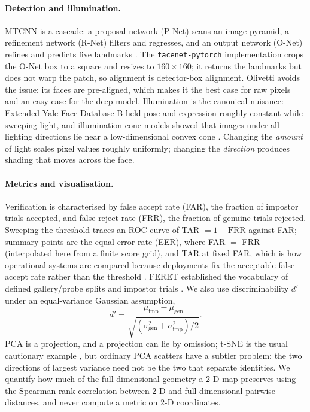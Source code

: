 \paragraph{Detection and illumination.} MTCNN is a cascade: a proposal network (P-Net) scans an image pyramid, a refinement network (R-Net) filters and regresses, and an output network (O-Net) refines and predicts five landmarks \citep{zhang2016}. The \texttt{facenet-pytorch} implementation crops the O-Net box to a square and resizes to $160\times160$; it returns the landmarks but does not warp the patch, so alignment is detector-box alignment. Olivetti avoids the issue: its faces are pre-aligned, which makes it the best case for raw pixels and an easy case for the deep model. Illumination is the canonical nuisance: Extended Yale Face Database B held pose and expression roughly constant while sweeping light, and illumination-cone models showed that images under all lighting directions lie near a low-dimensional convex cone \citep{georghiades2001}. Changing the \emph{amount} of light scales pixel values roughly uniformly; changing the \emph{direction} produces shading that moves across the face.

\paragraph{Metrics and visualisation.} Verification is characterised by false accept rate (FAR), the fraction of impostor trials accepted, and false reject rate (FRR), the fraction of genuine trials rejected. Sweeping the threshold traces an ROC curve of TAR $=1-\mathrm{FRR}$ against FAR; summary points are the equal error rate (EER), where FAR $=$ FRR (interpolated here from a finite score grid), and TAR at fixed FAR, which is how operational systems are compared because deployments fix the acceptable false-accept rate rather than the threshold \citep{grother2019}. FERET established the vocabulary of defined gallery/probe splits and impostor trials \citep{phillips2000}. We also use discriminability $d'$ under an equal-variance Gaussian assumption,
\begin{equation}
d'=\frac{\mu_{\mathrm{imp}}-\mu_{\mathrm{gen}}}{\sqrt{(\sigma_{\mathrm{gen}}^2+\sigma_{\mathrm{imp}}^2)/2}}.
\label{eq:dprime}
\end{equation}
PCA is a projection, and a projection can lie by omission; t-SNE is the usual cautionary example \citep{maaten2008}, but ordinary PCA scatters have a subtler problem: the two directions of largest variance need not be the two that separate identities. We quantify how much of the full-dimensional geometry a 2-D map preserves using the Spearman rank correlation between 2-D and full-dimensional pairwise distances, and never compute a metric on 2-D coordinates.
